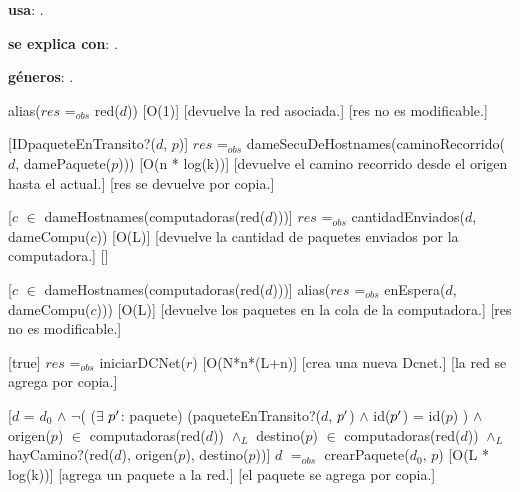 \begin{Interfaz}

  \textbf{usa}: .
  
  \textbf{se explica con}: .

  \textbf{g\'eneros}: .


  {alias($res$ =$_{obs}$ red($d$))}%
  [O(1)]
  [devuelve la red asociada.]
  [res no es modificable.]

  [IDpaqueteEnTransito?($d$, $p$)]
  {$res$ =$_{obs}$ dameSecuDeHostnames(caminoRecorrido($d$, damePaquete($p$)))}%
  [O(n * log(k))]
  [devuelve el camino recorrido desde el origen hasta el actual.]
  [res se devuelve por copia.]
  
  [$c$ $\in$ dameHostnames(computadoras(red($d$)))]
  {$res$ =$_{obs}$ cantidadEnviados($d$, dameCompu($c$))}%
  [O(L)]
  [devuelve la cantidad de paquetes enviados por la computadora.]
  []

  [$c$ $\in$ dameHostnames(computadoras(red($d$)))]
  {alias($res$ =$_{obs}$ enEspera($d$, dameCompu($c$)))}%
  [O(L)]
  [devuelve los paquetes en la cola de la computadora.]
  [res no es modificable.]
  
  [true]
  {$res$ =$_{obs}$ iniciarDCNet($r$)}%
  [O(N*n*(L+n)]
  [crea una nueva Dcnet.]
  [la red se agrega por copia.]
    
  [$d$ = $d_0$ $\wedge$ $\neg$( ($\exists$ $p\sp{\prime}$: paquete) (paqueteEnTransito?($d$, $p\sp{\prime}$) $\wedge$ id($p\sp{\prime}$) = id($p$) ) $\wedge$ \newline
  origen($p$) $\in$ computadoras(red($d$)) $\wedge_L$ destino($p$) $\in$ computadoras(red($d$)) $\wedge_L$ hayCamino?(red($d$), origen($p$), destino($p$))]
  {$d$ $=_{obs}$ crearPaquete($d_0$, $p$)}%
  [O(L * log(k))]
  [agrega un paquete a la red.]
  [el paquete se agrega por copia.]

\newpage


\end{Interfaz}
